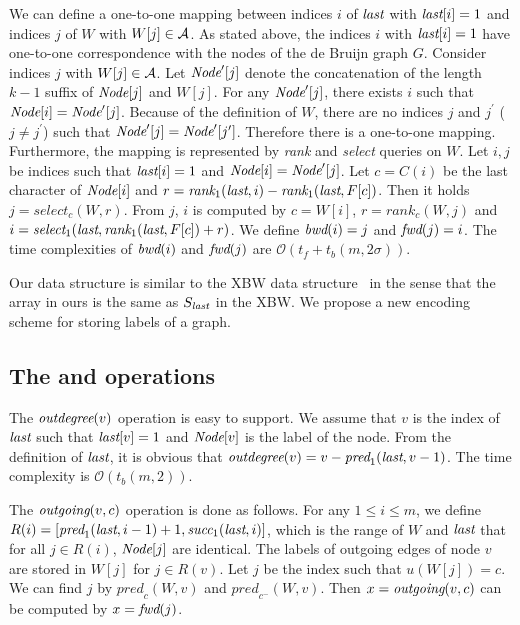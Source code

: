 \documentclass{llncs}
\newcommand{\Order}{\mathcal{O}}
\def\rank{\textit{rank}}
\def\select{\textit{select}}
\def\access{\textit{access}}
\def\pred{\textit{pred}}
\def\succ{\textit{succ}}
\begin{document}
We can define a one-to-one mapping between indices $i$ of ${\textit{last}}$ with ${\textit{last}}[i] = 1$
and indices $j$ of $W$ with $W[j] \in {\cal A}$.
As stated above, the indices $i$ with ${\textit{last}}[i] = 1$ have one-to-one correspondence with
the nodes of the de Bruijn graph $G$.  Consider indices $j$ with $W[j] \in {\cal A}$.
Let ${\textit{Node}}^\prime[j]$ denote
the concatenation of the length $k-1$ suffix of ${\textit{Node}}[j]$ and $W[j]$.
For any ${\textit{Node}}^\prime[j]$, there exists $i$ such that ${\textit{Node}}[i] = {\textit{Node}}^\prime[j]$.
Because of the definition of $W$, there are no indices $j$ and $j^\prime$ 
($j \neq j^\prime$) such that ${\textit{Node}}^\prime[j] = {\textit{Node}}^\prime[j^\prime]$.
Therefore there is a one-to-one mapping.  Furthermore, the mapping is represented by
{\rank} and {\select} queries on $W$.
Let $i,j$ be indices such that ${\textit{last}}[i] = 1$ and ${\textit{Node}}[i] = {\textit{Node}}^\prime[j]$.
Let $c = C(i)$ be the last character of ${\textit{Node}}[i]$ and 
$r = {\rank}_1({\last}, i) - {\rank}_1({\last}, F[c])$.
Then it holds $j = {\select}_c(W, r)$.  
From $j$, $i$ is computed by $c = W[i]$, $r = {\rank}_c(W, j)$ and
$i = {\select}_1({\last}, {\rank}_1({\last}, F[c]) + r)$.
We define $\textit{bwd}(i) = j$ and $\textit{fwd}(j) = i$.
The time complexities of $\textit{bwd}(i)$ and $\textit{fwd}(j)$ are
$\Order(t_f + t_b(m,2\sigma))$.


Our data structure is similar to the XBW data structure~\cite{FLMM09} in the sense
that the {\last} array in ours is the same as $S_{\textit{last}}$ in the XBW.
We propose a new encoding scheme for storing labels of a graph.


\subsection{The {\cdeg} and {\child} operations}
The ${\textit{outdegree}}(v)$ operation is easy to support.
We assume that $v$ is the index of ${\textit{last}}$ such that ${\textit{last}}[v] = 1$ and
${\textit{Node}}[v]$ is the label of the node.
From the definition of ${\textit{last}}$, it is obvious that 
${\cdeg}(v) = v - {\pred}_1({\last}, v-1)$.
The time complexity is $\Order(t_b(m,2))$.

The ${\textit{outgoing}}(v,c)$ operation is done as follows.
For any $1 \le i \le m$, we define $R(i) = [{\pred}_1({\last},i-1)+1,{\succ}_1({\last},i)]$,
which is the range of $W$ and ${\textit{last}}$ that for all $j \in R(i)$, ${\textit{Node}}[j]$ are identical.
The labels of outgoing edges of node $v$ are stored in $W[j]$ for $j \in R(v)$.
%
Let $j$ be the index such that $u(W[j]) = c$.
We can find $j$ by ${\pred}_c(W, v)$ and ${\pred}_{c^-}(W, v)$.
Then $x = {\textit{outgoing}}(v,c)$ can be computed by $x = \textit{fwd}(j)$.
\end{document}
